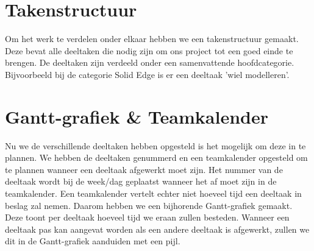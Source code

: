 \documentclass[a4paper,twoside,kulak]{kulakreport}
\begin{document}
	\section*{Takenstructuur}Om het werk te verdelen onder elkaar hebben we een takenstructuur gemaakt. Deze bevat alle deeltaken die nodig zijn om ons project tot een goed einde te brengen. De deeltaken zijn verdeeld onder een samenvattende hoofdcategorie. Bijvoorbeeld bij de categorie Solid Edge is er een deeltaak 'wiel modelleren'. 
	\section*{Gantt-grafiek \& Teamkalender} Nu we de verschillende deeltaken hebben opgesteld is het mogelijk om deze in te plannen. We hebben de deeltaken genummerd en een teamkalender opgesteld om te plannen wanneer een deeltaak afgewerkt moet zijn. Het nummer van de deeltaak wordt bij de week/dag geplaatst wanneer het af moet zijn in de teamkalender. Een teamkalender vertelt echter niet hoeveel tijd een deeltaak in beslag zal nemen. Daarom hebben we een bijhorende Gantt-grafiek gemaakt. Deze toont per deeltaak hoeveel tijd we eraan zullen besteden. Wanneer een deeltaak pas kan aangevat worden als een andere deeltaak is afgewerkt, zullen we dit in de Gantt-grafiek aanduiden met een pijl. 
\end{document}
